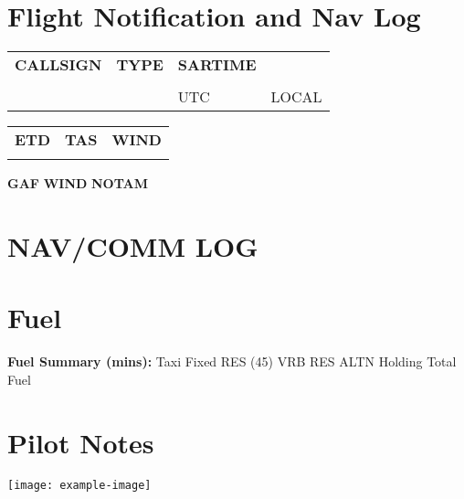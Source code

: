 \documentclass[a5paper,10pt]{article}
\newcommand{\boxheight}{0.5cm}
\newcommand{\boxwidthA}{2.5cm}
\newcommand{\boxwidthB}{3.5cm}
\newcommand{\inputbox}[2]{\fbox{\rule{0pt}{#1}\hspace{#2}}}
\newcommand{\checkbox}{\fbox{\rule{0pt}{0.3cm}\hspace{0.3cm}}}
\begin{document}
\small
\section*{Flight Notification and Nav Log}

\noindent
\begin{tabular}{p{3cm} p{3cm} p{3cm} p{3cm}}
\textbf{CALLSIGN} & \textbf{TYPE} & \textbf{SARTIME} & ~ \\
\inputbox{\boxheight}{\boxwidthA} & \inputbox{\boxheight}{\boxwidthA} & \inputbox{\boxheight}{\boxwidthA} & \inputbox{\boxheight}{\boxwidthA} \\
& & {\tiny UTC} & {\tiny LOCAL} \\
\end{tabular}

\vspace{0.1cm}

\noindent
\begin{tabular}{p{4cm} p{4cm} p{4cm}}
\textbf{ETD} & \textbf{TAS} & \textbf{WIND} \\
\inputbox{\boxheight}{\boxwidthB} & \inputbox{\boxheight}{\boxwidthB} & \inputbox{\boxheight}{\boxwidthB} \\
\end{tabular}

\vspace{0.3cm}

\noindent \textbf{GAF} \checkbox \hspace{1cm} \textbf{WIND} \checkbox \hspace{1cm} \textbf{NOTAM} \checkbox

\section*{NAV/COMM LOG}

\navcommlogtable

\section*{Fuel}

\noindent
\begin{minipage}[t]{7.3cm}
\end{minipage}
\hfill
\begin{minipage}[t]{7.3cm}
\end{minipage}

\vspace{0.5cm}
\noindent \textbf{Fuel Summary (mins):} Taxi \hspace{1.5cm} Fixed RES (45) \hspace{1.5cm} VRB RES \hspace{1.5cm} ALTN \hspace{1.5cm} Holding \hspace{1.5cm} Total Fuel

\vspace{0.5cm}
\section*{Pilot Notes}
\vspace{3cm}

\texttt{[image: example-image]}
\end{document}
